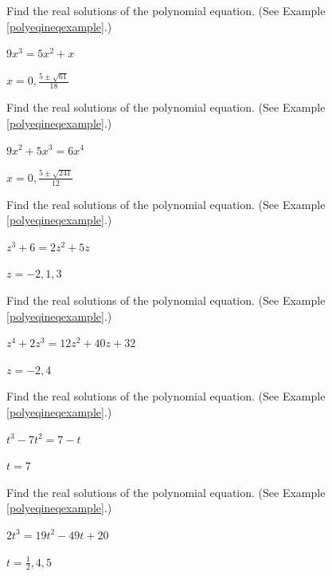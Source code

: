 \documentclass{ximera}
\begin{document}
\begin{problem}\label{polyequexerfirst}
Find the real solutions of the polynomial equation.  (See Example \ref{polyeqineqexample}.)

$9x^{3} = 5x^{2} + x$ 

\begin{solution}
$x = 0, \frac{5\pm \sqrt{61}}{18}$
\end{solution}

\end{problem}
  
\begin{problem}
Find the real solutions of the polynomial equation.  (See Example \ref{polyeqineqexample}.)

$9x^{2}+5x^{3}= 6x^{4}$ 

\begin{solution}
$x = 0, \frac{5 \pm \sqrt{241}}{12}$
\end{solution}
\end{problem} 

\begin{problem}
Find the real solutions of the polynomial equation.  (See Example \ref{polyeqineqexample}.)

$z^{3} + 6 = 2z^{2} + 5z$ 

\begin{solution}
$z = -2,1,3$
\end{solution}

\end{problem} 

\begin{problem}
Find the real solutions of the polynomial equation.  (See Example \ref{polyeqineqexample}.)

$z^{4} + 2z^{3} = 12z^{2} + 40z + 32$ 

\begin{solution}
$z=-2,4$
\end{solution}

\end{problem} 

\begin{problem}
Find the real solutions of the polynomial equation.  (See Example \ref{polyeqineqexample}.)

$t^{3} - 7t^{2} = 7-t$

\begin{solution}
$t=7$
\end{solution}
\end{problem} 

\begin{problem}
Find the real solutions of the polynomial equation.  (See Example \ref{polyeqineqexample}.)

$2t^{3} = 19t^{2} - 49t + 20$ 

\begin{solution}
$t = \frac{1}{2}, 4, 5$
\end{solution}

\end{problem}  
\end{document}
